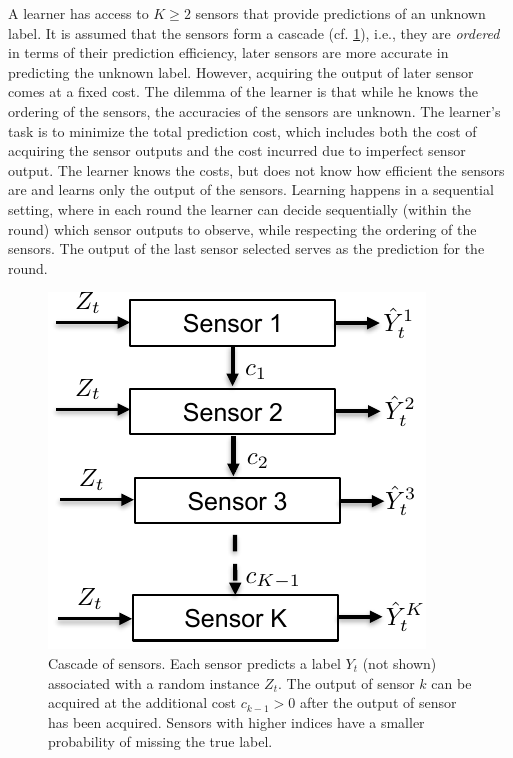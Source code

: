 A learner has access to $K\geq 2$ sensors that provide predictions
of an unknown label. 
 It is assumed that the sensors form a cascade (cf. \cref{wrap-fig:1}),
i.e., they are  \emph{ordered} in terms of their prediction efficiency,
later sensors are more accurate in predicting the unknown label.
However, acquiring the output of later sensor comes at a fixed cost.
The dilemma of the learner is that while he knows the ordering of the sensors,
the accuracies of the sensors are unknown.
The learner's task is to minimize the total prediction cost, which includes
both the cost of acquiring the sensor outputs and the cost incurred due to imperfect
sensor output.
The learner knows the costs, but does not know how efficient the sensors are
and learns only the output of the sensors.
Learning happens in a sequential setting, where in each round the learner can decide
sequentially (within the round) which sensor outputs to observe,
while respecting the ordering of the sensors.
The output of the last sensor selected serves as the prediction for the round.


\begin{figure}
	\vspace{-.5cm}
	\centering
	\includegraphics[scale=.6]{../Figures/SensorCascade}
	\caption{Cascade of sensors.
	Each sensor predicts a label $Y_t$ (not shown) associated
	with a random instance $Z_t$. The output of sensor $k$
	can be acquired at the additional cost $c_{k-1}>0$ after 
	the output of sensor has been acquired. Sensors with higher indices
	have a smaller probability of missing the true label.
	}\label{wrap-fig:1}
	\vspace{-.5cm}
\end{figure} 



